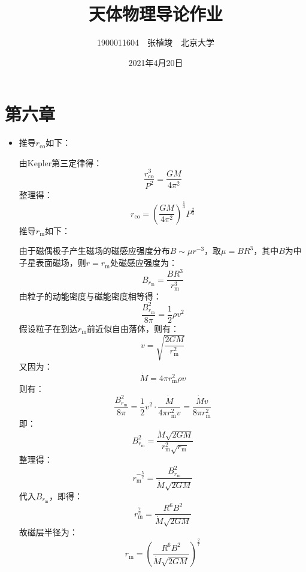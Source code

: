 \documentclass[a4paper,fontset=none]{ctexart}
\begin{document}
    \title{\textbf{天体物理导论作业}}
    \author{1900011604\ \ 张植竣\ \ 北京大学}
    \date{2021年4月20日}
    \maketitle

    \section*{第六章}

    \begin{itemize}

        \item[1.]
        推导$r_{\mathrm{co}}$如下：
        
        由Kepler第三定律得：
        \[
        \frac{r_{\mathrm{co}}^3}{P^2} = \frac{GM}{4\pi^2}
        \]
        整理得：
        \[
        r_{\mathrm{co}} = \left(\frac{GM}{4\pi^2}\right)^{\tfrac{1}{3}}P^{\tfrac{2}{3}}
        \]
        推导$r_{\mathrm{m}}$如下：
        
        由于磁偶极子产生磁场的磁感应强度分布$B \sim \mu r^{-3}$，取$\mu = BR^3$，其中$B$为中子星表面磁场，则$r = r_{\mathrm{m}}$处磁感应强度为：
        \[
        B_{r_{\mathrm{m}}} = \frac{BR^3}{r_{\mathrm{m}}^3}
        \]
        由粒子的动能密度与磁能密度相等得：
        \[
        \frac{B_{r_{\mathrm{m}}}^2}{8\pi} = \frac{1}{2}\rho v^2
        \]
        假设粒子在到达$r_{\mathrm{m}}$前近似自由落体，则有：
        \[
        v = \sqrt{\frac{2GM}{r_{\mathrm{m}}^2}}
        \]
        又因为：
        \[
        \dot{M} = 4\pi r_{\mathrm{m}}^2\rho v
        \]
        则有：
        \[
        \frac{B_{r_{\mathrm{m}}}^2}{8\pi} = \frac{1}{2}v^2\cdot\frac{\dot{M}}{4\pi r_{\mathrm{m}}^2 v} = \frac{\dot{M}v}{8\pi r_{\mathrm{m}}^2}
        \]
        即：
        \[
        B_{r_{\mathrm{m}}}^2 = \frac{\dot{M}\sqrt{2GM}}{r_{\mathrm{m}}^2\sqrt{r_{\mathrm{m}}}}
        \]
        整理得：
        \[
        r_{\mathrm{m}}^{-\tfrac{5}{2}} = \frac{B_{r_{\mathrm{m}}}^2}{\dot{M}\sqrt{2GM}}
        \]
        代入$B_{r_{\mathrm{m}}}$，即得：
        \[
        r_{\mathrm{m}}^{\tfrac{7}{2}} = \frac{R^6 B^2}{\dot{M}\sqrt{2GM}}
        \]
        故磁层半径为：
        \[
        r_{\mathrm{m}} = \left({\frac{R^6 B^2}{\dot{M}\sqrt{2GM}}}\right)^{\tfrac{2}{7}}
        \]


\end{itemize}
\end{document}
